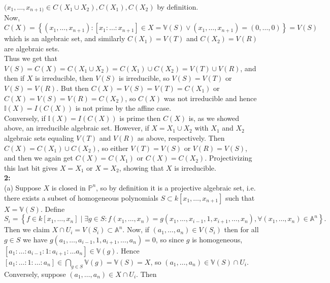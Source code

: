 \documentclass[a4paper]{article}
\begin{document}
    $ (x_1,\ldots,x_{n+1)} \in C(X_1 \cup X_2), C(X_1), C(X_2)$ by
    definition.\\
    Now, $C(X) 
    = \left\{ (x_1, \ldots, x_{n+1})  \colon
    \left[ x_1: \ldots : x_{n+1} \right] 
\in X = \mathbb{V}(S) \lor (x_1, \ldots, x_{n+1}) = (0,\ldots,0)\right\} 
= V(S)$ which is an algebraic set, and similarly
$C(X_1) = V(T)$ and $C(X_2) = V(R)$ are algebraic sets.\\
Thus we get that
$V(S) = C(X) = C(X_1 \cup X_2) = C(X_1 ) \cup C(X_2)
= V(T) \cup V(R)$, and then if $X$ is irreducible, then
$V(S)$ is irreducible, so $V(S) = V(T)$ or $V(S) = V(R)$. But then
$C(X) = V(S) = V(T) = C(X_1)$ or
$C(X) = V(S) = V(R)= C(X_2)$, so
$C(X)$ was not irreducible and hence
$\mathbb{I}(X) = I\left( C(X) \right) $ is not prime by the affine case.\\
\linebreak
Conversely, if $\mathbb{I}(X) = I(C(X))$ is prime then
$C(X)$ is, as we showed above, an irreducible algebraic set. However, if
$X = X_1 \cup X_2$ with $X_1$ and $X_2$ algebraic sets equaling
$V(T)$ and $V(R)$ as above, respectively. Then
$C(X) = C(X_1) \cup C(X_2)$, so either
$V(T) = V(S)$ or $V(R) = V(S)$, and then we again get
$C(X) = C(X_1)$ or $C(X) = C(X_2)$. Projectivizing this last bit gives
$X = X_1$
 or $X = X_2$, showing that $X$ is irreducible.\\
 \linebreak
 \textbf{2:}\\
 (a) Suppose $X$ is closed in $\mathbb{P}^{n}$, so by definition it is
 a projective algebraic set, i.e. there exists
 a subset of homogeneous polynomials $S \subset k\left[ x_1, \ldots, x_{n+1} \right] $
 such that
 $X = \mathbb{V}(S)$. Define
 \[
 S_i = \left\{ 
 f \in k\left[ x_1, \ldots, x_n \right]  \mid 
 \exists g \in S  \colon
 f(x_1, \ldots, x_n) =
 g(x_1, \ldots, x_{i-1}, 1, x_{i+1},\ldots, x_n), 
 \forall (x_1,\ldots, x_n) \in \mathbb{A}^{n}
\right\}. \]
Then we claim
$X \cap U_i = V(S_i) \subset \mathbb{A}^{n}$.
Now, if $(a_1, \ldots, a_n) \in V(S_i)$ then
for all  $g \in S$ we have
$g \left( a_1, \ldots, a_{i-1},1,a_{i+1},\ldots, a_n \right) = 0$, so
since $g$ is homogeneous,
$\left[ a_1: \ldots : a_{i-1}: 1: a_{i+1}: \ldots a_n \right] 
\in \mathbb{V}(g)$. Hence
$\left[ a_1: \ldots : 1 : \ldots : a_n \right] 
\in \bigcap_{g \in S} \mathbb{V}(g) 
= \mathbb{V}\left( S \right) =X  $, so
$(a_1, \ldots, a_n) \in \mathbb{V}(S) \cap U_i$.\\
\linebreak
Conversely, suppose $(a_1, \ldots, a_n) \in X \cap U_i$. Then
\end{document}
